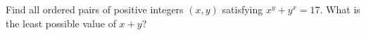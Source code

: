 Find all ordered pairs of positive integers $(x,y)$ satisfying $x^y+y^x=17$. What is the least possible value of $x+y$?
